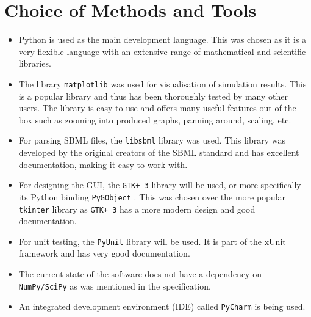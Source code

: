 \documentclass{article}
\begin{document}
	\section{Choice of Methods and Tools}
	
	
	\begin{itemize}
		\item Python is used as the main development language. This was chosen as it is a very flexible language with an extensive range of mathematical and scientific libraries.
		\item The library \verb|matplotlib| \cite{matplotlib} was used for visualisation of simulation results. This is a popular library and thus has been thoroughly tested by many other users. The library is easy to use and offers many useful features out-of-the-box such as zooming into produced graphs, panning around, scaling, etc.
		\item For parsing SBML files, the \verb|libsbml| \cite{libsbml} library was used. This library was developed by the original creators of the SBML standard and has excellent documentation, making it easy to work with.
		\item For designing the GUI, the \verb|GTK+ 3| \cite{gtk} library will be used, or more specifically its Python binding \verb|PyGObject| \cite{gtk_python}. This was chosen over the more popular \verb|tkinter| \cite{tkinter} library as \verb|GTK+ 3| has a more modern design and good documentation.
		\item For unit testing, the \verb|PyUnit| \cite{pyunit} library will be used. It is part of the xUnit framework and has very good documentation.
		\item The current state of the software does not have a dependency on \verb|NumPy/SciPy| \cite{numpy, scipy} as was mentioned in the specification.
		\item An integrated development environment (IDE) called \verb|PyCharm| \cite{pycharm} is being used.	
\end{itemize}
	
\end{document}
